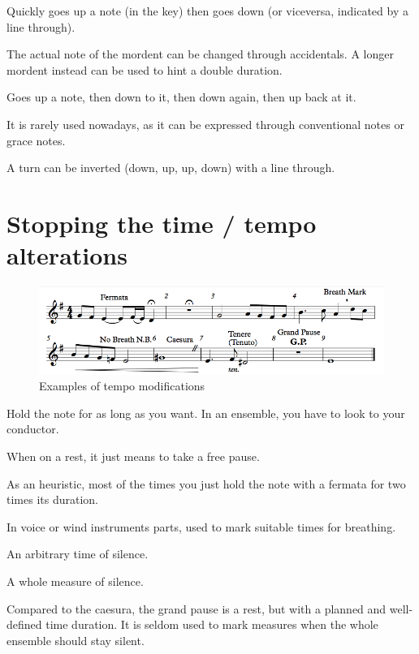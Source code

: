 \begin{definition}[Mordent]
    Quickly goes up a note (in the key) then goes down (or viceversa, indicated by a line through).
\end{definition}

The actual note of the mordent can be changed through accidentals. A longer mordent instead can be used to hint a double duration.

\begin{definition}
    Goes up a note, then down to it, then down again, then up back at it.

    It is rarely used nowadays, as it can be expressed through conventional notes or grace notes.
\end{definition}

A turn can be inverted (down, up, up, down) with a line through.

\section{Stopping the time / tempo alterations}

\begin{figure}[b]
    \begin{center}
        \includegraphics[width=\textwidth]{img/stoppingtime}
        \caption{Examples of tempo modifications}
    \end{center}
\end{figure}

\begin{definition}
    Hold the note for as long as you want. In an ensemble, you have to look to your conductor.

    When on a rest, it just means to take a free pause.
\end{definition}

As an heuristic, most of the times you just hold the note with a fermata for two times its duration.

\begin{definition}
    In voice or wind instruments parts, used to mark suitable times for breathing.
\end{definition}

\begin{definition}[Caesura]
    An arbitrary time of silence.
\end{definition}

\begin{definition}
    A whole measure of silence.
\end{definition}

Compared to the caesura, the grand pause is a rest, but with a planned and well-defined time duration. It is seldom used to mark measures when the whole ensemble should stay silent.